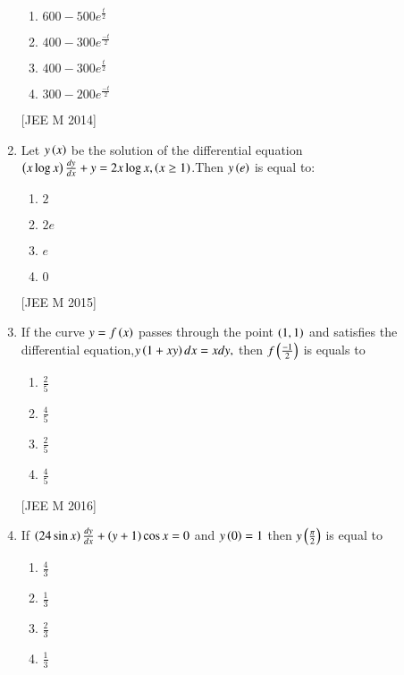 \documentclass[journal]{IEEEtran}
\begin{document}
\begin{enumerate}
\begin{multicols}{2}
 \begin{enumerate}
    \item $ 600-500e^\frac{t}{2}$
    \item $ 400-300e^\frac{-t}{2}$
    \item $ 400-300e^\frac{t}{2}$
    \item $ 300-200e^\frac{-t}{2}$
 \end{enumerate}
\end{multicols}
\hfill
{[JEE M 2014]}
\item Let $y\left(x\right)$ be the solution of the differential equation $\left(x\log{x}\right)\frac{d{y}}{d{x}} + y = 2x \log{x},\left(x\geq 1\right)$.Then $y\left(e\right)$ is equal to:
\begin{multicols}{2}
 \begin{enumerate}
    \item $ 2 $
    \item $ 2e $
    \item $ e $
    \item $ 0 $
 \end{enumerate}
\end{multicols}
\hfill
{[JEE M 2015]}

\item If the curve $ y=f\left(x\right)$ passes through the point $ \left(1,1\right)$ and satisfies the differential equation,$ y\left(1+xy\right)d{x}=xd{y},$ then $ f\left(\frac{-1}{2}\right)$ is equals to 
\begin{multicols}{2}
 \begin{enumerate}
    \item $ \frac{2}{5}$



    \item $ \frac{4}{5}$


    \item $ \frac{2}{5}$



    \item $ \frac{4}{5}$


  \end{enumerate}
\end{multicols}
\hfill
{[JEE M 2016]}

\item If $ \left(24 \sin{x}\right)\frac{d{y}}{d{x}}+ \left(y+1\right)\cos{x}=0$ and $y\left(0\right)=1$ then $y\left(\frac{\pi}{2}\right)$ is equal to
\begin{multicols}{2}
 \begin{enumerate}
    \item $\frac{4}{3}$
    \item $\frac{1}{3}$
    \item $\frac{2}{3}$
    \item $\frac{1}{3}$
    

\end{enumerate}
\end{multicols}
\end{enumerate}
\end{document}
